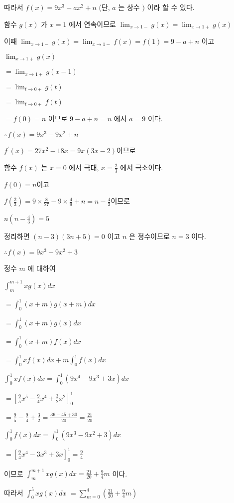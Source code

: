 \documentclass{oblivoir}
\begin{document}
따라서 $f(x)=9 x^{3}-a x^{2}+n$ (단, $a$ 는 상수 $)$ 이라 할 수 있다.

함수 $g(x)$ 가 $x=1$ 에서 연속이므로 $\lim _{x \rightarrow 1-} g(x)=\lim _{x \rightarrow 1+} g(x)$

이때 $\lim _{x \rightarrow 1-} g(x)=\lim _{x \rightarrow 1-} f(x)=f(1)=9-a+n$ 이고

$\lim _{x \rightarrow 1+} g(x) $

$=\lim _{x \rightarrow 1+} g(x-1)$

$=\lim _{t \rightarrow 0+} g(t)$

$=\lim _{t \rightarrow 0+} f(t)$

$=f(0)=n$ 이므로 $9-a+n=n$ 에서 $a=9$ 이다.

$\therefore f(x)=9 x^{3}-9 x^{2}+n$

$f^{\prime}(x)=27 x^{2}-18 x=9 x(3 x-2)$이므로

함수 $f(x)$ 는 $x=0$ 에서 극대, $x=\frac{2}{3}$ 에서 극소이다.

$f(0)=n$이고

$f\left(\frac{2}{3}\right)=9 \times \frac{8}{27}-9 \times \frac{4}{9}+n=n-\frac{4}{3}$이므로

$n\left(n-\frac{4}{3}\right)=5$

정리하면 $(n-3)(3 n+5)=0$ 이고 $n$ 은 정수이므로 $n=3$ 이다.

$\therefore f(x)=9 x^{3}-9 x^{2}+3$

정수 $m$ 에 대하여

$\int_{m}^{m+1} x g(x) d x$

$=\int_{0}^{1}(x+m) g(x+m) d x$

$=\int_{0}^{1}(x+m) g(x) d x$

$=\int_{0}^{1}(x+m) f(x) d x$

$=\int_{0}^{1} x f(x) d x+m \int_{0}^{1} f(x) d x$

$\int_{0}^{1} x f(x) d x=\int_{0}^{1}\left(9 x^{4}-9 x^{3}+3 x\right) d x$

$=\left[\frac{9}{5} x^{5}-\frac{9}{4} x^{4}+\frac{3}{2} x^{2}\right]_{0}^{1}$

$=\frac{9}{5}-\frac{9}{4}+\frac{3}{2}=\frac{36-45+30}{20}=\frac{21}{20}$

$\int_{0}^{1} f(x) d x=\int_{0}^{1}\left(9 x^{3}-9 x^{2}+3\right) d x$

$=\left[\frac{9}{4} x^{4}-3 x^{3}+3 x\right]_{0}^{1}=\frac{9}{4}$

이므로 $\int_{m}^{m+1} x g(x) d x=\frac{21}{20}+\frac{9}{4} m$ 이다.

따라서 $\int_{0}^{5} x g(x) d x $
$=\sum_{m=0}^{4}\left(\frac{21}{20}+\frac{9}{4} m\right)$
\end{document}
